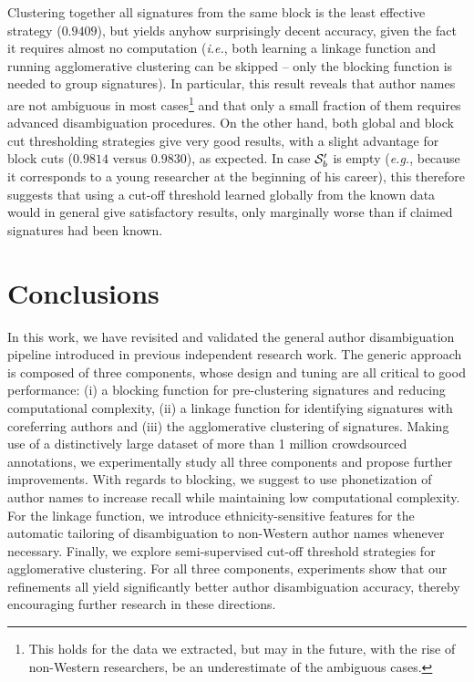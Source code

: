 \documentclass{article}
\newcommand{\ie}{\emph{i.e.}\xspace}
\newcommand{\eg}{\emph{e.g.}\xspace}
\begin{document}
Clustering together all signatures from the same block is the least effective
strategy ($0.9409$), but yields anyhow surprisingly decent accuracy, given the
fact it requires almost no computation (\ie, both learning a linkage function
and running agglomerative clustering can be skipped -- only the blocking
function is needed to group signatures). In particular, this result reveals
that author names are not ambiguous in most cases\footnote{This holds for the
data we extracted, but may in the future, with the rise of non-Western
researchers, be an underestimate of the ambiguous cases.} and that only a small
fraction of them requires advanced disambiguation procedures. On the other
hand, both global and block cut thresholding strategies give very good results,
with a slight advantage for block cuts ($0.9814$ versus $0.9830$), as expected.
In case ${\cal S}^\prime_b$ is empty (\eg, because it corresponds to a young
researcher at the beginning of his career), this therefore suggests that using
a cut-off threshold learned globally from the known data would in general give
satisfactory results, only marginally worse than if claimed signatures had been
known.



\section{Conclusions}
\label{conclusions}

In this work, we have revisited and validated the general author disambiguation
pipeline introduced in previous independent research work.
The generic approach is composed of three components, whose design and tuning are all critical
to good performance: (i) a blocking function for pre-clustering signatures
and reducing computational complexity, (ii) a linkage function for identifying
signatures with coreferring authors and (iii) the agglomerative clustering of
signatures. Making use of a distinctively large dataset of more than 1 million
crowdsourced annotations, we experimentally study all three components and
propose further improvements. With regards to blocking, we suggest to use
phonetization of author names to increase recall while maintaining low
computational complexity. For the linkage function, we introduce
ethnicity-sensitive features for the automatic tailoring of disambiguation to non-Western
author names whenever necessary. Finally, we explore semi-supervised cut-off
threshold strategies for agglomerative clustering. For all three components,
experiments show that our refinements all yield significantly better author
disambiguation accuracy, thereby encouraging further research in these directions.
\end{document}
